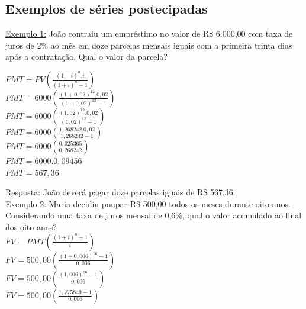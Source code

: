 \documentclass[
	article,			%
	11pt,				%
	oneside,			%
	a4paper,			%
	english,			%
	brazil,				%
	sumario=tradicional
	]{abntex2}
\begin{document}
\subsection{Exemplos de séries postecipadas}

\noindent \normalsize  \underline{Exemplo 1:} João contraiu um empréstimo no valor de R\$ 6.000,00 com taxa de juros de 2\% ao mês em doze parcelas mensais iguais com a primeira trinta dias após a contratação. Qual o valor da parcela?

\noindent$ PMT = PV \left( \frac{ ( 1 + i ) ^{n} .i }{ ( 1 + i ) ^{n} - 1 } \right)  $\\

\noindent$ PMT = 6000 \left( \frac{ ( 1 + 0,02 ) ^{12} .0,02 }{ ( 1 + 0,02 ) ^{12} - 1 } \right)  $\\

\noindent$ PMT = 6000 \left( \frac{ ( 1,02 ) ^{12} .0,02 }{ ( 1,02 ) ^{12} - 1 } \right)  $\\

\noindent$ PMT = 6000 \left( \frac{ 1,268242 .0,02 }{ 1,268242 - 1 } \right)  $\\

\noindent$ PMT = 6000 \left( \frac{ 0,025365 }{ 0,268242 } \right)  $\\

\noindent$ PMT = 6000 . 0,09456  $\\

\noindent$ PMT = 567,36  $

\noindent Resposta: João deverá pagar doze parcelas iguais de R\$ 567,36.\\

\noindent \underline{Exemplo 2:} Maria decidiu poupar R\$ 500,00 todos os meses durante oito anos. Considerando uma taxa de juros mensal de 0,6\%, qual o valor acumulado ao final dos oito anos?\\

\noindent$ FV = PMT \left( \frac{ ( 1 + i ) ^{n} - 1 }{ i } \right) $\\

\noindent$ FV = 500,00 \left( \frac{ ( 1 + 0,006 ) ^{96} - 1 }{ 0,006 } \right) $\\

\noindent$ FV = 500,00 \left( \frac{ ( 1,006 ) ^{96} - 1 }{ 0,006 } \right) $\\

\noindent$ FV = 500,00 \left( \frac{ 1,775849 - 1 }{ 0,006 } \right) $\\
\end{document}
